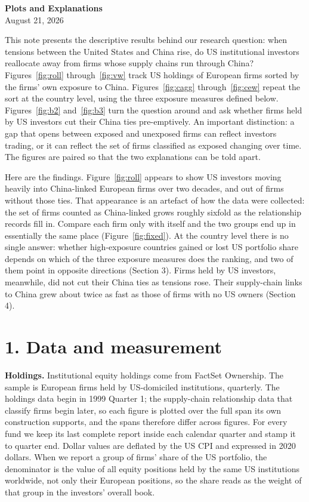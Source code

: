 \documentclass[11pt]{article}
\begin{document}
\begin{center}
{\Large\bfseries Plots and Explanations}\\[6pt]
{\normalsize August 21, 2026}
\end{center}

\bigskip

\noindent
This note presents the descriptive results behind our research question: when
tensions between the United States and China rise, do US institutional
investors reallocate away from firms whose supply chains run through China?
Figures~\ref{fig:roll} through~\ref{fig:vw} track US holdings of European
firms sorted by the firms' own exposure to China. Figures~\ref{fig:cagg}
through~\ref{fig:cew} repeat the sort at the country level, using the three
exposure measures defined below. Figures~\ref{fig:b2} and~\ref{fig:b3} turn
the question around and ask whether firms held by US investors cut their China
ties pre-emptively. An important distinction:
a gap that opens between exposed and unexposed firms can reflect investors
trading, or it can reflect the set of firms classified as exposed changing
over time. The figures are paired so that the two explanations can be told
apart.

Here are the findings. Figure~\ref{fig:roll} appears to show US investors
moving heavily into China-linked European firms over two decades, and out of
firms without those ties. That appearance is an artefact of how the data were
collected: the set of firms counted as China-linked grows roughly sixfold as
the relationship records fill in. Compare each firm only with itself and the
two groups end up in essentially the same place (Figure~\ref{fig:fixed}). At
the country level there is no single answer: whether high-exposure countries
gained or lost US portfolio share depends on which of the three exposure
measures does the ranking, and two of them point in opposite directions
(Section 3). Firms held by US investors, meanwhile, did not cut their China
ties as tensions rose. Their supply-chain links to China grew about twice as
fast as those of firms with no US owners (Section 4).

\section*{1. Data and measurement}

\textbf{Holdings.} Institutional equity holdings come from FactSet Ownership.
The sample is European firms held by US-domiciled institutions, quarterly. The
holdings data begin in 1999 Quarter 1; the supply-chain relationship data that classify
firms begin later, so each figure is plotted over the full span its own
construction supports, and the
spans therefore differ across figures. For every fund we keep its last
complete report inside each calendar quarter and stamp it to quarter end. Dollar values are deflated by the
US CPI and expressed in 2020 dollars. When we report a group of firms' share
of the US portfolio, the denominator is the value of all equity positions
held by the same US institutions worldwide, not only their European
positions, so the share reads as the weight of that group in the investors'
overall book.
\end{document}
